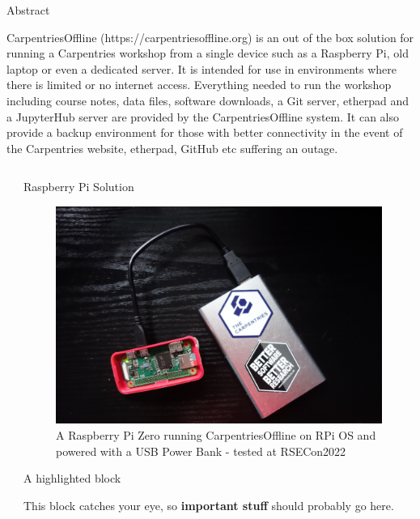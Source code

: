 \documentclass[final]{beamer}
\newlength{\sepwidth}
\newlength{\colwidth}
\newcommand{\separatorcolumn}{\begin{column}{\sepwidth}\end{column}}
\begin{document}
	\begin{frame}[t]
		\begin{block}{\large Abstract}	

			CarpentriesOffline (https://carpentriesoffline.org) is an out of the box solution for running a Carpentries workshop from a single device such as a Raspberry Pi, old laptop or even a dedicated server. It is intended for use in environments where there is limited or no internet access. Everything needed to run the workshop including course notes, data files, software downloads, a Git server, etherpad and a JupyterHub server are provided by the CarpentriesOffline system. It can also provide a backup environment for those with better connectivity in the event of the Carpentries website, etherpad, GitHub etc suffering an outage.
		\end{block}
	
		\begin{columns}[t]
			\separatorcolumn
			
			
			\begin{column}{\colwidth}
				
				\begin{block}{Raspberry Pi Solution}
					\begin{center}
						\begin{figure}
							\includegraphics[width=0.6\columnwidth]{logos/CarpentriesOfflinePhoto.png}
							\caption{A Raspberry Pi Zero running CarpentriesOffline on RPi OS and powered with a USB Power Bank - tested at RSECon2022}
						\end{figure}
					\end{center}

					
				\end{block}
				
				\begin{alertblock}{A highlighted block}
					
					This block catches your eye, so \textbf{important stuff} should probably go
					here.
					

\end{alertblock}
\end{column}
\end{columns}
\end{frame}
\end{document}
